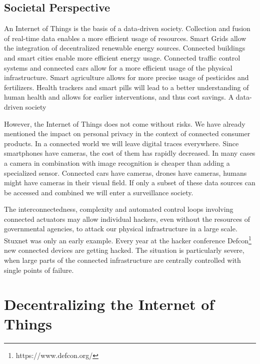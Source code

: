 \subsection{Societal Perspective}

An Internet of Things is the basis of a data-driven society. Collection and fusion of real-time data enables a more efficient usage of resources. Smart Grids allow the integration of decentralized renewable energy sources. Connected buildings and smart cities enable more efficient energy usage. Connected traffic control systems and connected cars allow for a more efficient usage of the physical infrastructure. Smart agriculture allows for more precise usage of pesticides and fertilizers. Health trackers and smart pills will lead to a better understanding of human health and allows for earlier interventions, and thus cost savings. A data-driven society 

However, the Internet of Things does not come without risks. We have already mentioned the impact on personal privacy in the context of connected consumer products. In a connected world we will leave digital traces everywhere. Since smartphones have cameras, the cost of them has rapidly decreased. In many cases a camera in combination with image recognition is cheaper than adding a specialized sensor. Connected cars have cameras, drones have cameras, humans might have cameras in their visual field. If only a subset of these data sources can be accessed and combined we will enter a surveillance society. 

The interconnectedness, complexity and automated control loops involving connected actuators may allow individual hackers, even without the resources of governmental agencies, to attack our physical infrastructure in a large scale. Stuxnet \parencite{5772960} was only an early example. Every year at the hacker conference Defcon\footnote{https://www.defcon.org/} new connected devices are getting hacked. The situation is particularly severe, when large parts of the connected infrastructure are centrally controlled with single points of failure. 


\section{Decentralizing the Internet of Things}

